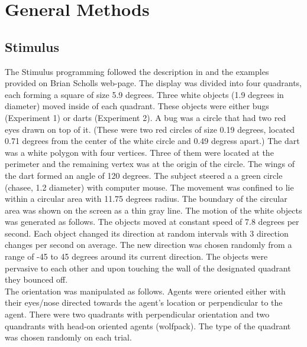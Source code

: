 \documentclass{article}
\begin{document}

\section{General Methods}

\subsection{Stimulus}
The Stimulus programming followed the description in \citet{gao10} and the examples provided on Brian Scholls web-page. 
The display was divided into four quadrants, each forming a square of size 5.9 degrees. 
Three white objects (1.9 degrees in diameter) moved inside of each quadrant. 
These objects were either bugs (Experiment 1) or darts (Experiment 2). 
A bug was a circle that had two red eyes drawn on top of it. 
(These were two red circles of size 0.19 degrees, located 0.71 degrees from the center of the white circle and 0.49 degress apart.) 
The dart was a white polygon with four vertices. 
Three of them were located at the perimeter and the remaining vertex was at the origin of the circle. 
The wings of the dart formed an angle of 120 degrees.
The subject steered a a green circle (chasee, 1.2 diameter) with computer mouse. 
The movement was confined to lie within a circular area with 11.75 degrees radius. 
The boundary of the circular area was shown on the screen as a thin gray line. 
The motion of the white objects was generated as follows. 
The objects moved at constant speed of 7.8 degrees per second. 
Each object changed its direction at random intervals with 3 direction changes per second on average. 
The new direction was chosen randomly from a range of -45 to 45 degrees around its current direction. 
The objects were pervasive to each other and upon touching the wall of the designated quadrant they bounced off. \\
The orientation was manipulated as follows. 
Agents were oriented either with their eyes/nose directed towards the agent's location or perpendicular to the agent. 
There were two quadrants with perpendicular orientation and two quandrants with head-on oriented agents (wolfpack). 
The type of the quadrant was chosen randomly on each trial. \\
\end{document}
